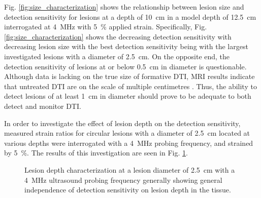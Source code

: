 			Fig. \ref{fig:size_characterization} shows the relationship between lesion size and detection sensitivity for lesions at a depth of \SI{10}{\cm} in a model depth of \SI{12.5}{\cm} interrogated at \SI{4}{\MHz} with \SI{5}{\percent} applied strain. Specifically, Fig. \ref{fig:size_characterization} shows the decreasing detection sensitivity with decreasing lesion size with the best detection sensitivity being with the largest investigated lesions with a diameter of \SI{2.5}{\cm}. On the opposite end, the detection sensitivity of lesions at or below \SI{0.5}{\cm} in diameter is questionable. Although data is lacking on the true size of formative DTI, MRI results indicate that untreated DTI are on the scale of multiple centimetres \cite{solis13}. Thus, the ability to detect lesions of at least \SI{1}{\cm} in diameter should prove to be adequate to both detect and monitor DTI.

			In order to investigate the effect of lesion depth on the detection sensitivity, measured strain ratios for circular lesions with a diameter of \SI{2.5}{\cm} located at various depths were interrogated with a \SI{4}{\MHz} probing frequency, and strained by \SI{5}{\percent}. The results of this investigation are seen in Fig. \ref{fig:depth_characterization}.

			\begin{figure}[!htb]
				\centering
				\caption[Quasi-static lesion depth characterization]{Lesion depth characterization at a lesion diameter of \SI{2.5}{\cm} with a \SI{4}{\MHz} ultrasound probing frequency generally showing general independence of detection sensitivity on lesion depth in the tissue.}
				\label{fig:depth_characterization}
			\end{figure}


